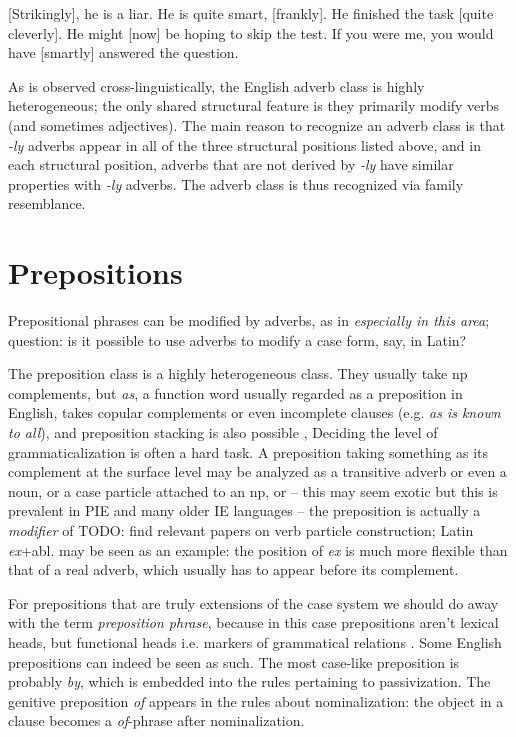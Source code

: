 \documentclass[UTF8, a4paper, oneside, scheme=plain, 12pt]{ctexbook}
\newcommand*{\citesec}[1]{\S~{#1}}
\newcommand*{\citepage}[1]{p.~{#1}}
\newcommand*{\term}[1]{\emph{#1}}
\newcommand{\form}[1]{\emph{#1}}
\begin{document}
\begin{exe}
    \ex\label{ex:overview.adverb-1} [Strikingly], he is a liar.
    \ex\label{ex:overview.adverb-2} He is quite smart, [frankly].
    \ex\label{ex:overview.adverb-5} He finished the task [quite cleverly].
    \ex\label{ex:overview.adverb-3} He might [now] be hoping to skip the test.
    \ex\label{ex:overview.adverb-4} If you were me, you would have [smartly] answered the question.
\end{exe}

As is observed cross-linguistically,
the English adverb class is highly heterogeneous;
the only shared structural feature 
is they primarily modify verbs 
(and sometimes adjectives).
The main reason to recognize an adverb class 
is that \form{-ly} adverbs appear in all of the three structural positions listed above, 
and in each structural position, 
adverbs that are not derived by \form{-ly} 
have similar properties with \form{-ly} adverbs.
The adverb class is thus recognized via family resemblance.

\section{Prepositions}\label{sec:pos.prep}

Prepositional phrases can be modified by adverbs,
as in \form{especially in this area};
question: is it possible to use adverbs to modify a case form, say, in Latin?

The preposition class is a highly heterogeneous class.
They usually take \acs{np} complements, 
but \form{as}, a function word usually regarded as a preposition in English, 
takes copular complements or even incomplete clauses (e.g. \form{as is known to all}), 
and preposition stacking is also possible
\citep[\citepage{609}]{cgel},
Deciding the level of grammaticalization is often a hard task.
A preposition taking something as its complement at the surface level 
may be analyzed as a transitive adverb or even a noun,
or a case particle attached to an \acs{np}, 
or -- this may seem exotic but this is prevalent in PIE and many older IE languages --
the preposition is actually a \emph{modifier} of TODO: find relevant papers on verb particle construction;
Latin \form{ex}+abl. may be seen as an example: 
the position of \form{ex} is much more flexible than 
that of a real adverb, which usually has to appear before its complement.

For prepositions that are truly extensions of the case system 
we should do away with the term \term{preposition phrase},
because in this case prepositions aren't lexical heads,
but functional heads i.e. markers of grammatical relations
\citep[\citesec{5.4}]{dixon2009basic1}.
Some English prepositions can indeed be seen as such.
The most case-like preposition is probably \form{by}, 
which is embedded into the rules pertaining to passivization.
The genitive preposition \form{of} 
appears in the rules about nominalization:
the object in a clause becomes a \form{of}-phrase after nominalization.
\end{document}
